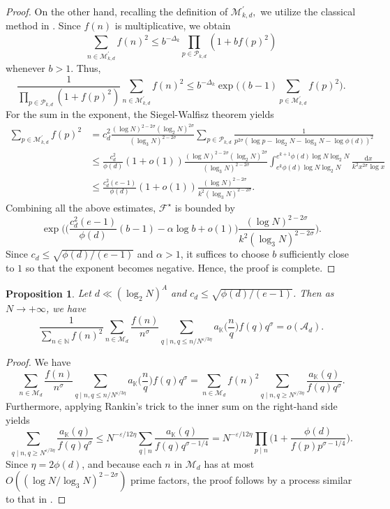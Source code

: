\documentclass[12pt,reqno]{amsart}
\newtheorem{prop}{Proposition}[section]
\theoremstyle{definition}
\numberwithin{equation}{section}
\newcommand{\mbk}{\mathbb{K}}
\newcommand{\mbn}{\mathbb{N}}
\newcommand{\mca}{\mathcal{A}}
\newcommand{\mcf}{\mathcal{F}}
\newcommand{\mcp}{\mathcal{P}}
\newcommand{\mcm}{\mathcal{M}}
\begin{document}
\begin{proof}
On the other hand, recalling the definition of $\mcm^{\prime}_{k,d},$ we utilize the classical method in \cite[p. 8]{bondarenko2017large}. Since $f(n)$ is multiplicative, we obtain
$$
\sum_{n\in\mcm^{\prime}_{k,d}} f(n)^2 \le b^{-\Delta_k} \prod_{p\in \mcp_{k,d}} (1 + b f(p)^2)
$$
whenever $b>1$. Thus, 
$$
\frac{1}{\prod_{p\in \mcp_{k,d}} (1 + f(p)^2)} \sum_{n\in\mcm^{\prime}_{k,d}} f(n)^2 \le b^{-\Delta_k} \exp\Big( (b - 1)\sum_{p\in \mcm^{\prime}_{k,d}}f(p)^2\Big).
$$
For the sum in the exponent, the Siegel-Walfisz theorem yields 
\begin{align*}
\sum_{p\in \mcm^{\prime}_{k,d}} f(p)^2 &= c_d^2\frac{(\log N)^{2-2\sigma}(\log_2 N)^{2\sigma}}{(\log_3 N)^{2-2\sigma}} \sum_{p\in \mcp_{k,d}} \frac{1}{p^{2\sigma}(\log p - \log_2 N - \log_3 N - \log \phi(d))^2} \\
&\le \frac{c_d^2}{\phi(d)} (1 + o(1))\frac{(\log N)^{2-2\sigma}(\log_2 N)^{2\sigma}}{(\log_3 N)^{2-2\sigma}} \int_{e^k \phi(d) \log N \log_2 N}^{e^{k+1} \phi(d) \log N \log_2 N} \frac{\mathrm{d}x}{k^2 x^{2\sigma}\log x}\\
&\le \frac{c_d^2 (e-1)}{\phi(d)}(1 + o(1))\frac{(\log N)^{2-2\sigma}}{k^2 (\log_3 N)^{2-2\sigma}}.
\end{align*}
Combining all the above estimates, $\mcf^\star$ is bounded by
$$
\exp\bigg(\bigg(\frac{c_d^2 (e-1)}{\phi(d)}(b - 1) - \alpha\log b + o(1)\bigg)\frac{(\log N)^{2-2\sigma}}{k^2 (\log_3 N)^{2-2\sigma}}\bigg).
$$
Since $c_d \le \sqrt{\phi(d)/(e-1)}$ and $\alpha>1$, it suffices to choose $b$ sufficiently close to $1$ so that the exponent becomes negative. Hence, the proof is complete.
\end{proof}

\begin{prop}
    \label{prop43}
    Let $d \ll (\log_2 N)^A$ and $c_d \le \sqrt{\phi(d)/(e-1)}$. Then     as $N \to +\infty$, we have 
    $$
    \frac{1}{\sum_{n \in \mbn} f(n)^2} \sum_{n \in \mcm_d} \frac{f(n)}{n^{\sigma}} \sum_{q \mid n, q \leq n/N^{\varepsilon/3\eta}} a_\mbk \Big( \frac{n}{q}\Big)f(q)q^{\sigma}=o(\mca_d).
    $$
\end{prop}
\begin{proof}
We have
$$
\sum_{n \in \mcm_d} \frac{f(n)}{n^{\sigma}} \sum_{q \mid n, q \leq n/N^{\varepsilon/3\eta}} a_\mbk \Big( \frac{n}{q}\Big)f(q)q^{\sigma} = \sum_{n \in \mcm_d} f(n)^2 \sum_{q \mid n, q \geq N^{\varepsilon/3\eta}} \frac{a_\mbk(q)}{f(q)q^\sigma}.
$$
Furthermore, applying Rankin’s trick to the inner sum on the right-hand side yields
$$
\sum_{q \mid n, q \geq N^{\varepsilon/3\eta}} \frac{a_\mbk(q)}{f(q)q^\sigma} \le N^{-\varepsilon/12\eta}\sum_{q \mid n}  \frac{a_\mbk(q)}{f(q)q^{\sigma-1/4}} =  N^{-\varepsilon/12\eta} \prod_{p \mid n}\Big(1+ \frac{\phi(d)}{f(p)p^{\sigma-1/4}} \Big).
$$
Since $\eta = 2\phi(d)$, and because each $n$ in $\mcm_d$ has at most $ O((\log N / \log_3 N)^{2-2\sigma})$ prime factors, the proof follows by a process similar to that in \cite[Lemma 6]{bondarenko2023dichotomy}.
\end{proof}
\end{document}
